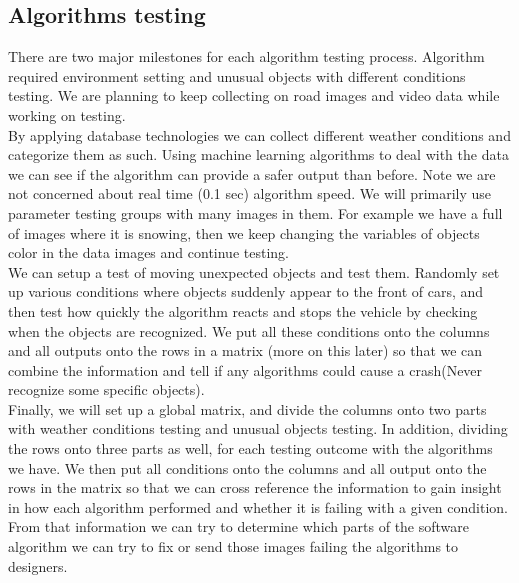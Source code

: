 \documentclass[10pt,draftclsnofoot,onecolumn,journal,compsoc]{IEEEtran}
\begin{document}
\subsection{Algorithms testing}
There are two major milestones for each algorithm testing process. 
Algorithm required environment setting and unusual objects with different conditions testing. 
We are planning to keep collecting on road images and video data while working on testing.\\
By applying database technologies we can collect different weather conditions and categorize them as such. 
Using machine learning algorithms to deal with the data we can see if the algorithm can provide a safer output than before. 
Note we are not concerned about real time (0.1 sec) algorithm speed. 
We will primarily use parameter testing groups with many images in them. 
For example we have a full of images where it is snowing, then we keep changing the variables of objects color in the data images and continue testing.\\
We can setup a test of moving unexpected objects and test them. 
Randomly set up various conditions where objects suddenly appear to the front of cars, and then test how quickly the algorithm reacts and stops the vehicle by checking when the objects are recognized. 
We put all these conditions onto the columns and all outputs onto the rows in a matrix (more on this later) so that we can combine the information and tell if any algorithms could cause a crash(Never recognize some specific objects).\\
Finally, we will set up a global matrix, and divide the columns onto two parts with weather conditions testing and unusual objects testing. 
In addition, dividing the rows onto three parts as well, for each testing outcome with the algorithms we have. 
We then put all conditions onto the columns and all output onto the rows in the matrix so that we can cross reference the information to gain insight in how each algorithm performed and whether it is failing with a given condition.
From that information we can try to determine which parts of the software algorithm we can try to fix or send those images failing the algorithms to designers.
\end{document}

